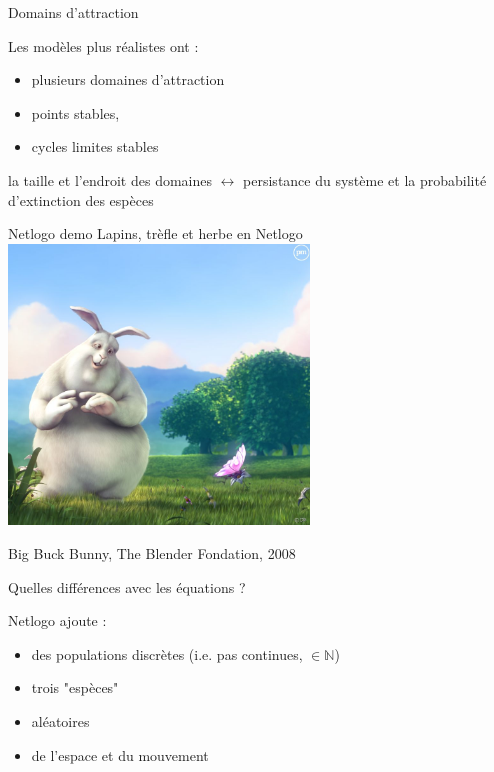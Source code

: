 \documentclass[11,aspectratio=1610]{beamer}
\begin{document}
\begin{frame}{Domains d'attraction}


Les modèles plus réalistes ont : 



\begin{itemize}
  \item  \alert{plusieurs} domaines d'attraction 
  \item points stables,
  \item cycles limites stables 
\end{itemize}


\vfill



la \alert{taille} et  \alert{l'endroit} des domaines  $\leftrightarrow$ \alert{persistance} du système et la  \alert{probabilité d'extinction} des espèces\\


\vfill



  
\end{frame}




\begin{frame}{Netlogo demo}
\vfill
Lapins, trèfle et herbe en Netlogo
\vfill
\centering
\includegraphics[width=0.6\textwidth]{img/bunny.jpg}

\tiny{Big Buck Bunny, The Blender Fondation, 2008}

  
\end{frame}

\begin{frame}{Quelles différences avec les équations ? }

Netlogo ajoute : 

\begin{itemize}
  \item des populations discrètes (i.e. pas continues, $\in \mathbb{N}$) 
  \item trois "espèces"
  \item aléatoires
  \item de l'espace et du mouvement
\end{itemize}


\end{frame}
\end{document}
